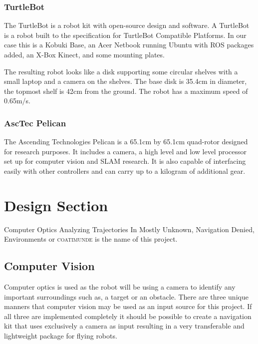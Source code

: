 \documentclass{article}
\begin{document}
		\subsubsection{TurtleBot}
		
		The TurtleBot is a robot kit with open-source design and software. A TurtleBot is a robot built to the specification for TurtleBot Compatible Platforms\cite{wise_foote_2011}. In our case this is a Kobuki Base, an Acer Netbook running Ubuntu with ROS packages added, an X-Box Kinect, and some mounting plates. 
		
		The resulting robot looks like a disk supporting some circular shelves with a small laptop and a camera on the shelves. The base disk is 35.4cm in diameter, the topmost shelf is 42cm from the ground. The robot has a maximum speed of 0.65m/s. 
		
		\subsubsection{AscTec Pelican}
		
		The Ascending Technologies Pelican is a 65.1cm by 65.1cm quad-rotor  designed for research purposes\cite{asctec}. It includes a camera, a high level and low level processor set up for computer vision and SLAM research. It is also capable of interfacing easily with other controllers and can carry up to a kilogram of additional gear.
		
\section{Design Section}

	Computer Optics Analyzing Trajectories In Mostly Unknown, Navigation Denied, Environments or  \textsc{coatimunde} is the name of this project. 
	
	\subsection{Computer Vision}
	
	Computer optics is used as the robot will be using a camera to identify any important surroundings such as, a target or an obstacle. There are three unique manners that computer vision may be used as an input source for this project. If all three are implemented completely it should be possible to create a navigation kit that uses exclusively a camera as input resulting in a very transferable and lightweight package for flying robots.
	
\end{document}

